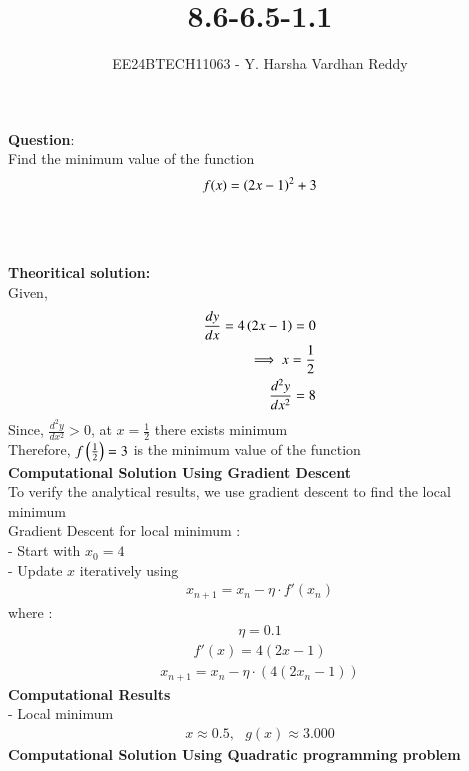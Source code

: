 \documentclass[journal]{IEEEtran}
\begin{document}

\vspace{3cm}

\title{8.6-6.5-1.1}
\author{EE24BTECH11063 - Y. Harsha Vardhan Reddy}
 \maketitle
{\let\newpage\relax\maketitle}

\renewcommand{\thefigure}{\theenumi}
\renewcommand{\thetable}{\theenumi}
\setlength{\intextsep}{10pt} %


\renewcommand{\thetable}{\theenumi}

\textbf{Question}:\\
Find the minimum value of the function\\
$$f(x)=\left(2x-1\right)^2+3$$\\
\solution \\
\\
\textbf{Theoritical solution:}\\
Given,\\
\begin{align}
    \frac{dy}{dx}=4\left(2x-1\right)=0\\
    \implies x=\frac{1}{2}\\
    \frac{d^2y}{dx^2}=8\\
\end{align}
Since, $\frac{d^2y}{dx^2}>0$, at $x=\frac{1}{2}$ there exists minimum  \\
Therefore, $f\left(\frac{1}{2}\right)=3$ is the minimum value of the function\\
\textbf{Computational Solution Using Gradient Descent} \\
To verify the analytical results, we use gradient descent to find the local minimum \\
Gradient Descent for local minimum : \\ 
 - Start with $x_0 = 4$ \\
 - Update $x$ iteratively using 
\begin{align}
    x_{n+1} = x_n - \eta \cdot f'(x_n)
\end{align}
where :
\begin{align}
    \eta = 0.1 
\end{align}
\begin{align}
    f'(x) = 4(2x-1) 
\end{align}
\begin{align}
    x_{n+1} = x_n - \eta \cdot (4(2x_n-1))
\end{align}
\textbf{Computational Results} \\
 - Local minimum 
 \begin{align}
     x \approx 0.5,\text{ } g(x) \approx 3.000
 \end{align} 
 \textbf{Computational Solution Using Quadratic programming problem} \\
\end{document}

